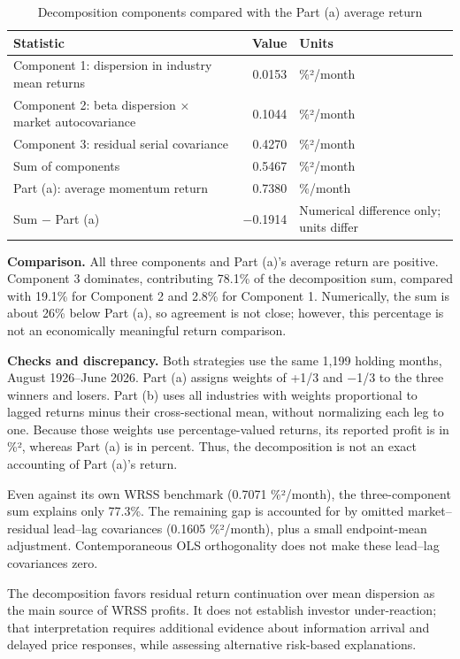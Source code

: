 \documentclass[11pt]{article}
\begin{document}
\begin{table}[H]
\centering
\caption{Decomposition components compared with the Part (a) average return}
\label{tab:compare}
\begin{tabularx}{\textwidth}{Xr>{\raggedright\arraybackslash}p{4.6cm}}
\toprule
Statistic & Value & Units \\
\midrule
Component 1: dispersion in industry mean returns & 0.0153 & \%²/month \\
Component 2: beta dispersion × market autocovariance & 0.1044 & \%²/month \\
Component 3: residual serial covariance & 0.4270 & \%²/month \\
Sum of components & 0.5467 & \%²/month \\
Part (a): average momentum return & 0.7380 & \%/month \\
Sum − Part (a) & −0.1914 & Numerical difference only; units differ \\
\bottomrule
\end{tabularx}
\end{table}
 
\textbf{Comparison.} All three components and Part (a)'s average return are positive. Component 3 dominates, contributing 78.1\% of the decomposition sum, compared with 19.1\% for Component 2 and 2.8\% for Component 1. Numerically, the sum is about 26\% below Part (a), so agreement is not close; however, this percentage is not an economically meaningful return comparison.
 
\textbf{Checks and discrepancy.} Both strategies use the same 1,199 holding months, August 1926–June 2026. Part (a) assigns weights of +1/3 and −1/3 to the three winners and losers. Part (b) uses all industries with weights proportional to lagged returns minus their cross-sectional mean, without normalizing each leg to one. Because those weights use percentage-valued returns, its reported profit is in \%², whereas Part (a) is in percent. Thus, the decomposition is not an exact accounting of Part (a)'s return.
 
Even against its own WRSS benchmark (0.7071 \%²/month), the three-component sum explains only 77.3\%. The remaining gap is accounted for by omitted market–residual lead–lag covariances (0.1605 \%²/month), plus a small endpoint-mean adjustment. Contemporaneous OLS orthogonality does not make these lead–lag covariances zero.
 
The decomposition favors residual return continuation over mean dispersion as the main source of WRSS profits. It does not establish investor under-reaction; that interpretation requires additional evidence about information arrival and delayed price responses, while assessing alternative risk-based explanations.
 
\end{document}
